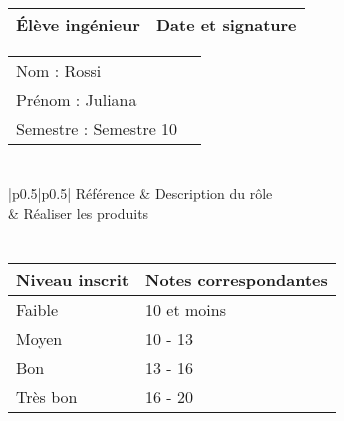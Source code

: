 \documentclass[11pt]{article}
\begin{document}

\begin{center}
\begin{table}[!hp]

	\begin{tabularx}{\linewidth}{|X|X|}
	\hline
	\rowcolor{gray!40} Élève ingénieur & Date et signature \\
	\hline
	\end{tabularx}
	\begin{tabularx}{\linewidth}{|X|X|}
	Nom : Rossi &  \\ 
	Prénom : Juliana & \\
	Semestre : Semestre 10 & \\
	\hline
	\end{tabularx}
\end{table}
\end{center}

\section*{\large\FR}

\centering
	\begin{longtable}{|p{0.5\textwidth}|p{0.5\textwidth}|}
	\hline
	 Référence \WBSCourt & Description du rôle \\
	 & Réaliser les produits \\
	 \hline
	\end{longtable}


\section*{\large\FC}


\begin{table}[!hp]
\centering
	\begin{tabularx}{\linewidth}{|X|X|}
	\hline
	\rowcolor{gray!40} Niveau inscrit & Notes correspondantes \\
	\hline
	 Faible & 10 et moins \\
	 \hline
	 Moyen & 10 - 13 \\
	 \hline
	 Bon & 13 - 16 \\
	 \hline
	 Très bon & 16 - 20 \\
	 \hline
	\end{tabularx}
\end{table}
\end{document}
